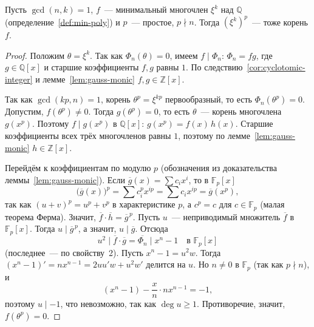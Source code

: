 \documentclass[12pt]{article}
\begin{document}
	\begin{lemma}\label{lem:cyclotomic-p-power}
		Пусть $\gcd(n, k) = 1$, $f$~--- минимальный многочлен $\xi^k$ над $\mathbb{Q}$ (определение~\ref{def:min-poly}) и $p$~--- простое, $p \nmid n$. Тогда $(\xi^k)^p$~--- тоже корень $f$.
	\end{lemma}
	\begin{proof}
		Положим $\theta = \xi^k$. Так как $\Phi_n(\theta) = 0$, имеем $f \mid \Phi_n$: $\Phi_n = f g$, где $g \in \mathbb{Q}[x]$ и старшие коэффициенты $f, g$ равны $1$. По следствию~\ref{cor:cyclotomic-integer} и лемме~\ref{lem:gauss-monic} $f, g \in \mathbb{Z}[x]$.

		Так как $\gcd(kp, n) = 1$, корень $\theta^p = \xi^{kp}$ первообразный, то есть $\Phi_n(\theta^p) = 0$. Допустим, $f(\theta^p) \ne 0$. Тогда $g(\theta^p) = 0$, то есть $\theta$~--- корень многочлена $g(x^p)$. Поэтому $f \mid g(x^p)$ в $\mathbb{Q}[x]$: $g(x^p) = f(x)\,h(x)$. Старшие коэффициенты всех трёх многочленов равны $1$, поэтому по лемме~\ref{lem:gauss-monic} $h \in \mathbb{Z}[x]$.

		Перейдём к коэффициентам по модулю $p$ (обозначения из доказательства леммы~\ref{lem:gauss-monic}). Если $\overline{g}(x) = \sum c_i x^i$, то в $\mathbb{F}_p[x]$
		\[
			\bigl(\overline{g}(x)\bigr)^p = \sum c_i^p x^{ip} = \sum c_i x^{ip} = \overline{g}(x^p),
		\]
		так как $(u + v)^p = u^p + v^p$ в характеристике $p$, а $c^p = c$ для $c \in \mathbb{F}_p$ (малая теорема Ферма). Значит, $\overline{f} \cdot \overline{h} = \overline{g}^{\,p}$. Пусть $u$~--- неприводимый множитель $\overline{f}$ в $\mathbb{F}_p[x]$. Тогда $u \mid \overline{g}^{\,p}$, а значит, $u \mid \overline{g}$. Отсюда
		\[
			u^2 \mid \overline{f} \cdot \overline{g} = \overline{\Phi_n} \mid x^n - 1 \quad \text{в } \mathbb{F}_p[x]
		\]
		(последнее~--- по свойству~2). Пусть $x^n - 1 = u^2 w$. Тогда $(x^n - 1)' = n x^{n-1} = 2uu'w + u^2 w'$ делится на $u$. Но $n \ne 0$ в $\mathbb{F}_p$ (так как $p \nmid n$), и
		\[
			(x^n - 1) - \dfrac{x}{n} \cdot n x^{n-1} = -1,
		\]
		поэтому $u \mid -1$, что невозможно, так как $\deg u \geqslant 1$. Противоречие, значит, $f(\theta^p) = 0$.
	\end{proof}
\end{document}
